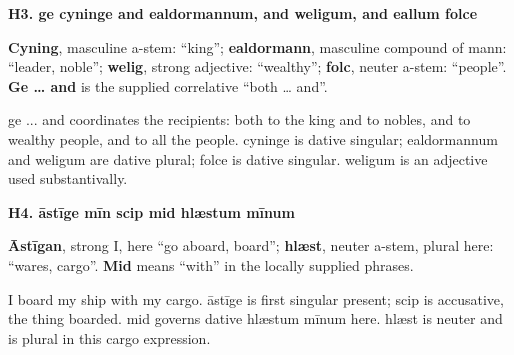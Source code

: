 \par\begin{minipage}{\linewidth}\raggedright
\textbf{H3. ge cyninge and ealdormannum, and weligum, and eallum folce}

\textbf{Cyning}, masculine a-stem: “king”; \textbf{ealdormann}, masculine compound of mann: “leader, noble”; \textbf{welig}, strong adjective: “wealthy”; \textbf{folc}, neuter a-stem: “people”. \textbf{Ge … and} is the supplied correlative “both … and”.

ge ... and coordinates the recipients: both to the king and to nobles, and to wealthy people, and to all the people. cyninge is dative singular; ealdormannum and weligum are dative plural; folce is dative singular. weligum is an adjective used substantivally.

\end{minipage}\par\addvspace{4pt}

\par\begin{minipage}{\linewidth}\raggedright
\textbf{H4. āstīge mīn scip mid hlæstum mīnum}

\textbf{Āstīgan}, strong I, here “go aboard, board”; \textbf{hlæst}, neuter a-stem, plural here: “wares, cargo”. \textbf{Mid} means “with” in the locally supplied phrases.

I board my ship with my cargo. āstīge is first singular present; scip is accusative, the thing boarded. mid governs dative hlæstum mīnum here. hlæst is neuter and is plural in this cargo expression.

\end{minipage}\par\addvspace{4pt}

